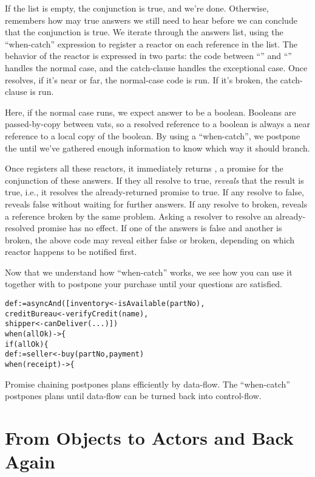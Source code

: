 \documentclass{llncs}
\begin{document}
If the list is empty, the conjunction is true, and we're
done. Otherwise,  remembers how may true answers we
still need to hear before we can conclude that the conjunction is
true. We iterate through the answers list, using the ``when-catch''
expression to register a reactor on each reference in the list. The
behavior of the reactor is expressed in two parts: the code between
``\code{->~\{}'' and ``'' handles the normal case, and
the catch-clause handles the exceptional case. Once 
resolves, if it's near or far, the normal-case code is run. If it's
broken, the catch-clause is run.

Here, if the normal case runs, we expect answer to be a
boolean. Booleans are passed-by-copy between vats, so a resolved
reference to a boolean is always a near reference to a local copy of
the boolean. By using a ``when-catch'', we postpone the 
until we've gathered enough information to know which way it should
branch.

Once  registers all these reactors, it immediately
returns , a promise for the conjunction of these
answers. If they all resolve to true,  \emph{reveals}
that the result is true, i.e., it resolves the already-returned
promise to true. If any resolve to false,  reveals false
without waiting for further answers. If any resolve to broken,
 reveals a reference broken by the same problem. Asking
a resolver to resolve an already-resolved promise has no effect. If
one of the answers is false and another is broken, the above
 code may reveal either false or broken, depending on
which reactor happens to be notified first.

Now that we understand how ``when-catch'' works, we see how you can
use it together with  to postpone your purchase until
your questions are satisfied.
%
\begin{alltt}
    def  := asyncAnd([inventory <- isAvailable(partNo),
                           creditBureau <- verifyCredit(name),
                           shipper <- canDeliver(...)])
    when (allOk) -> \{
        if (allOk) \{
            def  := seller <- buy(partNo, payment)
            when (receipt) -> \{
\end{alltt}
%
Promise chaining postpones plans efficiently by data-flow. The
``when-catch'' postpones plans until data-flow can be turned back into
control-flow.

\section{From Objects to Actors and Back Again}
\end{document}
